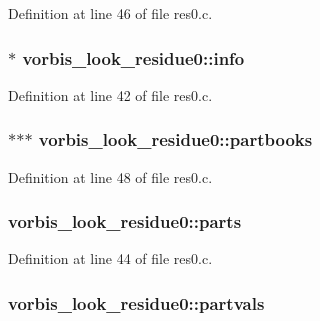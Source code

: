 Definition at line 46 of file res0.\+c.

\subsubsection[{\texorpdfstring{info}{info}}]{$\ast$ vorbis\+\_\+look\+\_\+residue0\+::info}\hypertarget{structvorbis__look__residue0_a252d1ad2f196e44467908b5047e0360b}{}\label{structvorbis__look__residue0_a252d1ad2f196e44467908b5047e0360b}


Definition at line 42 of file res0.\+c.

\subsubsection[{\texorpdfstring{partbooks}{partbooks}}]{$\ast$$\ast$$\ast$ vorbis\+\_\+look\+\_\+residue0\+::partbooks}\hypertarget{structvorbis__look__residue0_a762e98df374be2bdf9ce6992d96871c2}{}\label{structvorbis__look__residue0_a762e98df374be2bdf9ce6992d96871c2}


Definition at line 48 of file res0.\+c.

\subsubsection[{\texorpdfstring{parts}{parts}}]{ vorbis\+\_\+look\+\_\+residue0\+::parts}\hypertarget{structvorbis__look__residue0_a14945ea26ba740db9c5da5d5e1492677}{}\label{structvorbis__look__residue0_a14945ea26ba740db9c5da5d5e1492677}


Definition at line 44 of file res0.\+c.

\subsubsection[{\texorpdfstring{partvals}{partvals}}]{ vorbis\+\_\+look\+\_\+residue0\+::partvals}\hypertarget{structvorbis__look__residue0_a1f9815f5baffb975d6293b22107d2eaa}{}\label{structvorbis__look__residue0_a1f9815f5baffb975d6293b22107d2eaa}


